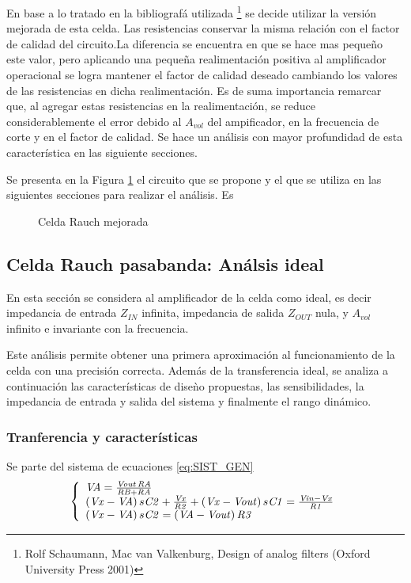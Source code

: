 En base a lo tratado en la bibliograf\'a utilizada \footnote{\label{fn:SCHAUMANN}Rolf Schaumann, Mac van Valkenburg, Design of analog filters (Oxford University Press 2001)} se decide utilizar la versi\'on mejorada de esta celda. Las resistencias conservar la misma relaci\'on con el factor de calidad del circuito.La diferencia se encuentra en que se hace mas peque\~no este valor, pero aplicando una peque\~na realimentaci\'on positiva al amplificador operacional se logra mantener el factor de calidad deseado cambiando los valores de las resistencias en dicha realimentaci\'on. Es de suma importancia remarcar que, al agregar estas resistencias en la realimentaci\'on, se reduce considerablemente el error debido al $A_{vol}$ del ampificador, en la frecuencia de corte y en el factor de calidad. Se hace un an\'alisis con mayor profundidad de esta caracter\'istica en las siguiente secciones.

Se presenta en la Figura \ref{fig:ENHANCED_RAUCH} el circuito que se propone y el que se utiliza en las siguientes secciones para realizar el an\'alisis. Es
\begin{figure}[H]
    \centering
    \caption{Celda Rauch mejorada}
    \label{fig:ENHANCED_RAUCH}
\end{figure}


\subsection{Celda Rauch pasabanda: An\'alsis ideal}
\label{sec:IDEAL_ANALISIS}
En esta secci\'on se considera al amplificador de la celda como ideal, es decir impedancia de entrada $Z_{IN}$ infinita, impedancia de salida $Z_{OUT}$ nula, y $A_{vol}$ infinito e invariante con la frecuencia.

Este an\'alisis permite obtener una primera aproximaci\'on al funcionamiento de la celda con una precisi\'on correcta. Adem\'as de la transferencia ideal, se analiza  a continuaci\'on  las caracter\'isticas de dise\`no propuestas, las sensibilidades, la impedancia de entrada y salida del sistema y finalmente el rango din\'amico.   
\subsubsection{Tranferencia y caracter\'isticas}
Se parte del sistema de ecuaciones  \ref{eq:SIST_GEN} 
\begin{equation}
    \left\{
        \begin{array}{lll}
            {\it VA}={\frac {{\it Vout}\,{\it RA}}{{\it RB}+{\it RA}}}\\
            \left( {\it Vx}-{\it VA} \right) s{\it C2}+{\frac {{\it Vx}}{{\it R2}
            }}+ \left( {\it Vx}-{\it Vout} \right) s{\it C1}={\frac {{\it Vin}-{
            \it Vx}}{{\it R1}}}\\
            \left( {\it Vx}-{\it VA} \right) s{\it C2}= \left( {\it VA}-{\it Vout
            } \right) {\it R3}

        \end{array}
    \right.
    \label{eq:SIST_GEN}
\end{equation}

